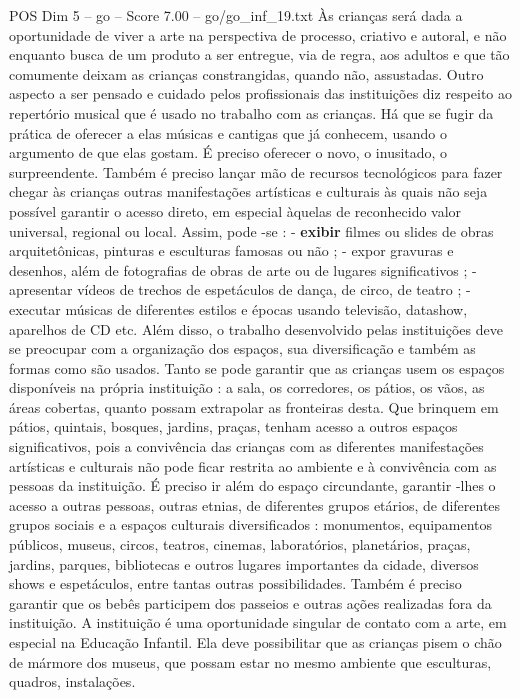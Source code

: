 \begin{textsample}{POS Dim 5 – go – Score 7.00 – go/go\_inf\_19.txt}
Às crianças será dada a oportunidade de viver a arte na perspectiva de processo, criativo e autoral, e não enquanto busca de um produto a ser entregue, via de regra, aos adultos e que tão comumente deixam as crianças constrangidas, quando não, assustadas.
Outro aspecto a ser pensado e cuidado pelos profissionais das instituições diz respeito ao repertório musical que é usado no trabalho com as crianças.
Há que se fugir da prática de oferecer a elas músicas e cantigas que já conhecem, usando o argumento de que elas gostam.
É preciso oferecer o novo, o inusitado, o surpreendente.
Também é preciso lançar mão de recursos tecnológicos para fazer chegar às crianças outras manifestações artísticas e culturais às quais não seja possível garantir o acesso direto, em especial àquelas de reconhecido valor universal, regional ou local.
Assim, pode -se : - \textbf{exibir} filmes ou slides de obras arquitetônicas, pinturas e esculturas famosas ou não ; - expor gravuras e desenhos, além de fotografias de obras de arte ou de lugares significativos ; - apresentar vídeos de trechos de espetáculos de dança, de circo, de teatro ; - executar músicas de diferentes estilos e épocas usando televisão, datashow, aparelhos de CD etc.
Além disso, o trabalho desenvolvido pelas instituições deve se preocupar com a organização dos espaços, sua diversificação e também as formas como são usados.
Tanto se pode garantir que as crianças usem os espaços disponíveis na própria instituição : a sala, os corredores, os pátios, os vãos, as áreas cobertas, quanto possam extrapolar as fronteiras desta.
Que brinquem em pátios, quintais, bosques, jardins, praças, tenham acesso a outros espaços significativos, pois a convivência das crianças com as diferentes manifestações artísticas e culturais não pode ficar restrita ao ambiente e à convivência com as pessoas da instituição.
É preciso ir além do espaço circundante, garantir -lhes o acesso a outras pessoas, outras etnias, de diferentes grupos etários, de diferentes grupos sociais e a espaços culturais diversificados : monumentos, equipamentos públicos, museus, circos, teatros, cinemas, laboratórios, planetários, praças, jardins, parques, bibliotecas e outros lugares importantes da cidade, diversos shows e espetáculos, entre tantas outras possibilidades.
Também é preciso garantir que os bebês participem dos passeios e outras ações realizadas fora da instituição.
A instituição é uma oportunidade singular de contato com a arte, em especial na Educação Infantil.
Ela deve possibilitar que as crianças pisem o chão de mármore dos museus, que possam estar no mesmo ambiente que esculturas, quadros, instalações.

\end{textsample}
